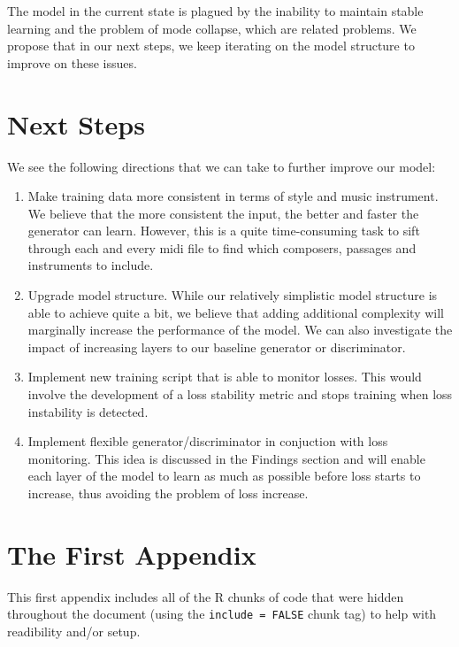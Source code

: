 \documentclass[12pt,oneside]{chicagocapstone}
\providecommand{\tightlist}{%
  \setlength{\itemsep}{0pt}\setlength{\parskip}{0pt}}
\begin{document}
The model in the current state is plagued by the inability to maintain stable learning and the problem of mode collapse, which are related problems. We propose that in our next steps, we keep iterating on the model structure to improve on these issues.

\hypertarget{next-steps}{%
\chapter*{Next Steps}\label{next-steps}}

We see the following directions that we can take to further improve our model:
\begin{enumerate}
\def\labelenumi{\arabic{enumi}.}
\tightlist
\item
  Make training data more consistent in terms of style and music instrument. We believe that the more consistent the input, the better and faster the generator can learn. However, this is a quite time-consuming task to sift through each and every midi file to find which composers, passages and instruments to include.
\item
  Upgrade model structure. While our relatively simplistic model structure is able to achieve quite a bit, we believe that adding additional complexity will marginally increase the performance of the model. We can also investigate the impact of increasing layers to our baseline generator or discriminator.
\item
  Implement new training script that is able to monitor losses. This would involve the development of a loss stability metric and stops training when loss instability is detected.
\item
  Implement flexible generator/discriminator in conjuction with loss monitoring. This idea is discussed in the Findings section and will enable each layer of the model to learn as much as possible before loss starts to increase, thus avoiding the problem of loss increase.
\end{enumerate}
\appendix

\hypertarget{the-first-appendix}{%
\chapter{The First Appendix}\label{the-first-appendix}}

This first appendix includes all of the R chunks of code that were hidden throughout the document (using the \texttt{include\ =\ FALSE} chunk tag) to help with readibility and/or setup.
\end{document}
